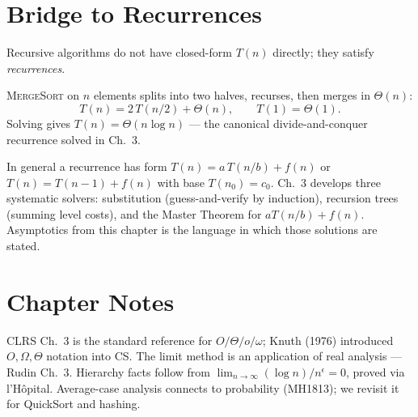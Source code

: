 \section{Bridge to Recurrences}
\label{sec:recurrences-bridge}
Recursive algorithms do not have closed-form $T(n)$ directly; they satisfy \emph{recurrences}.

\begin{example}
\textsc{MergeSort} on $n$ elements splits into two halves, recurses, then merges in $\Theta(n)$:
\[
T(n)=2\,T(n/2)+\Theta(n),\qquad T(1)=\Theta(1).
\]
Solving gives $T(n)=\Theta(n\log n)$ --- the canonical divide-and-conquer recurrence solved in Ch.~3.
\end{example}

In general a recurrence has form $T(n)=a\,T(n/b)+f(n)$ or $T(n)=T(n-1)+f(n)$ with base $T(n_{0})=c_{0}$. Ch.~3 develops three systematic solvers: substitution (guess-and-verify by induction), recursion trees (summing level costs), and the Master Theorem for $aT(n/b)+f(n)$. Asymptotics from this chapter is the language in which those solutions are stated.

\section{Chapter Notes}
CLRS Ch.~3 is the standard reference for $O/\Theta/o/\omega$; Knuth (1976) introduced $O,\Omega,\Theta$ notation into CS. The limit method is an application of real analysis --- Rudin Ch.~3. Hierarchy facts follow from $\lim_{n\to\infty}(\log n)/n^{\epsilon}=0$, proved via l'H\^opital. Average-case analysis connects to probability (MH1813); we revisit it for QuickSort and hashing.

